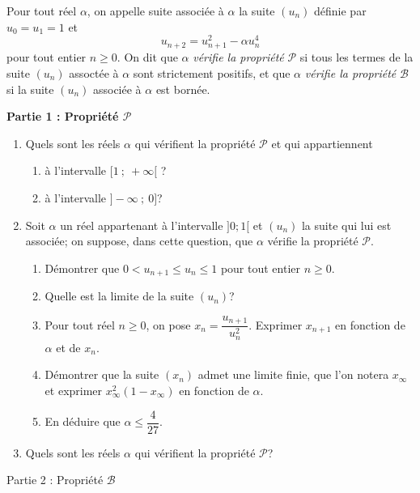 \documentclass[11pt,a4paper,french]{article}
\begin{document}
Pour tout réel $\alpha$, on appelle suite associée à $\alpha$ la suite $(u_n)$ définie par $u_0=u_1 = 1 $ et
 \[u_{n+2}=u^2_{n+1}-\alpha u_n^4\]
pour tout entier $n \geqslant 0$. On dit que  $\alpha$ \emph{vérifie la propriété} $\mathcal{P}$ si tous les termes de la suite $(u_n)$ assoctée à $\alpha$ sont strictement positifs, et que $\alpha$ \emph{vérifie la propriété} $\mathcal{B}$ si la suite $(u_n)$ associée à $\alpha$ est bornée.

\medskip
\begin{center}
\textbf{Partie 1 : Propriété $\mathcal{P}$}
\end{center}

\medskip

\begin{enumerate}
\item  Quels sont les réels $ \alpha $ qui vérifient la propriété $\mathcal{P}$ et qui appartiennent 
\begin{enumerate}
\item  à l'intervalle $[1~;~+\infty[$ ? 
\item à l'intervalle $]-\infty~;~0]$?
\end{enumerate}
\item Soit $\alpha$ un réel appartenant à l'intervalle $]0; 1[$ et $(u_n)$ la suite qui lui est associée; on suppose, dans cette question, que $\alpha$ vérifie la propriété $\mathcal{P}$.
\begin{enumerate}
\item  Démontrer que $0<u_{n+1}\leqslant u_n\leqslant 1$ pour tout entier $n \geqslant 0$.
\item Quelle est la limite de la suite $(u_n)$?
\item Pour tout réel $n \geqslant 0$, on pose $x_n=\dfrac{u_{n+1}}{u_n^2}$. Exprimer $x_{n+1}$ en fonction de $\alpha$ et de $x_n$.
\item Démontrer que la suite $(x_n)$ admet une limite finie, que l'on notera $x_{\infty}$ et exprimer $x_{\infty}^2 (1- x_{\infty})$ en fonction de $\alpha$.
\item En déduire que $\alpha\leqslant \dfrac{4}{27}$.
\end{enumerate}
\item  Quels sont les réels $\alpha$ qui vérifient la propriété $\mathcal{P}$? 
\end{enumerate}

\vspace{0.5cm}

\begin{center}
Partie 2 : Propriété $\mathcal{B}$
\end{center}
\end{document}
